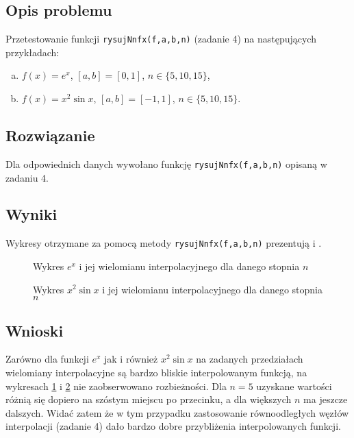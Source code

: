\documentclass[11pt]{mk-polish-lab-report}
\begin{document}
\subsection{Opis problemu}
Przetestowanie funkcji \texttt{rysujNnfx(f,a,b,n)} (zadanie 4) na następujących przykładach:
\begin{enumerate}[(a)]
\item $f(x) = e^x$, $[a, b] = [0,1]$, $n \in \{5,10,15\}$,
\item $f(x) = x^2\sin{x}$, $[a, b] = [-1,1]$, $n \in \{5,10,15\}$.
\end{enumerate}

\subsection{Rozwiązanie}
Dla odpowiednich danych wywołano funkcję \texttt{rysujNnfx(f,a,b,n)} opisaną w zadaniu 4.

\subsection{Wyniki}
Wykresy otrzymane za pomocą metody \texttt{rysujNnfx(f,a,b,n)} prezentują  i .
		\begin{figure}[h]
			\centering
			 \hfill
			 \hfill
			 \hfill
  			\caption{Wykres $e^{x}$ i jej wielomianu interpolacyjnego dla danego stopnia $n$}
  			\label{fig:1}
		\end{figure}		
		
		\begin{figure}[h]
			\centering
			 \hfill
			 \hfill
			 \hfill
  			\caption{Wykres $x^2\sin{x}$ i jej wielomianu interpolacyjnego dla danego stopnia $n$}
  			\label{fig:2}
		\end{figure}	
\subsection{Wnioski}
Zarówno dla funkcji $e^x$ jak i również $x^2\sin{x}$ na zadanych przedziałach wielomiany interpolacyjne są bardzo bliskie interpolowanym funkcją, na wykresach \ref{fig:1} i \ref{fig:2} nie zaobserwowano rozbieżności. Dla $n = 5$ uzyskane wartości różnią się dopiero na szóstym miejscu po przecinku, a dla większych $n$ ma jeszcze dalszych. Widać zatem że w tym przypadku zastosowanie równoodległych węzłów interpolacji (zadanie 4) dało bardzo dobre przybliżenia interpolowanych funkcji.
\end{document}
